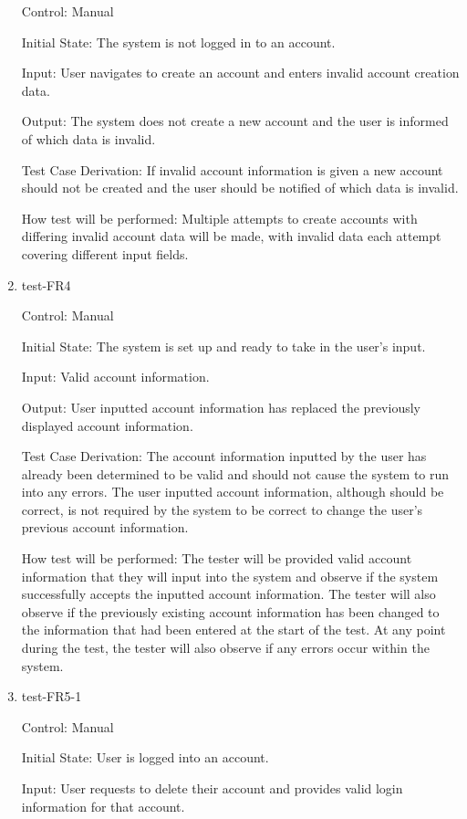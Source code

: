 \documentclass[12pt, titlepage]{article}
\begin{document}
\begin{enumerate}
  Control: Manual

  Initial State: The system is not logged in to an account.

  Input: User navigates to create an account and enters invalid account
  creation data.

  Output: The system does not create a new account and the user is informed of
  which data is invalid.

  Test Case Derivation: If invalid account information is given a new account
  should not be created and the user should be notified of which data is
  invalid.

  How test will be performed: Multiple attempts to create accounts with
  differing invalid account data will be made, with invalid data each attempt
  covering different input fields.

  \item{test-FR4\\}

  Control: Manual

  Initial State: The system is set up and ready to take in the user's input.

  Input: Valid account information.

  Output: User inputted account information has replaced the previously displayed
  account information.

  Test Case Derivation: The account information inputted by the user has already been
  determined to be valid and should not cause the system to run into any errors. The
  user inputted account information, although should be correct, is not required by
  the system to be correct to change the user's previous account information.

  How test will be performed: The tester will be provided valid account information
  that they will input into the system and observe if the system successfully
  accepts the inputted account information. The tester will also observe if the previously
  existing account information has been changed to the information that had been entered
  at the start of the test. At any point during the test, the tester will also observe if
  any errors occur within the system.

  \item{test-FR5-1\\}

  Control: Manual

  Initial State: User is logged into an account.

  Input: User requests to delete their account and provides valid login
  information for that account.


\end{enumerate}
\end{document}
